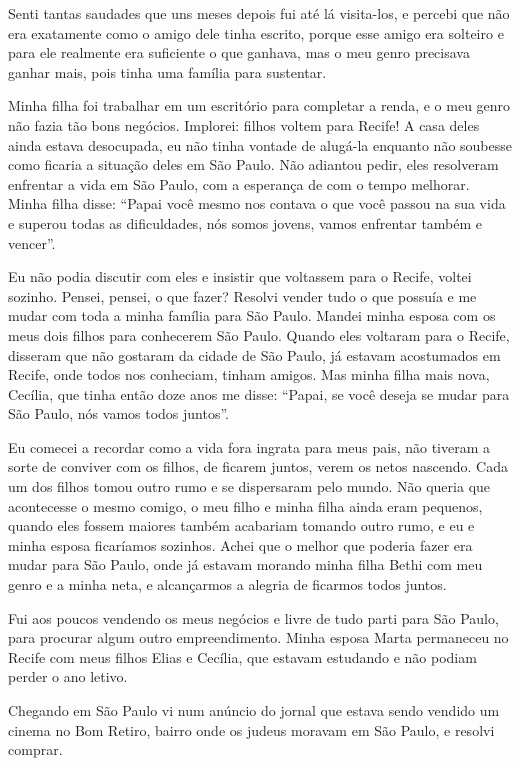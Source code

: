 Senti tantas saudades que uns meses depois fui até lá visita-los, e
percebi que não era exatamente como o amigo dele tinha escrito, porque
esse amigo era solteiro e para ele realmente era suficiente o que
ganhava, mas o meu genro precisava ganhar mais, pois tinha uma família
para sustentar.

Minha filha foi trabalhar em um escritório para completar a renda, e o
meu genro não fazia tão bons negócios. Implorei: filhos voltem para
Recife! A casa deles ainda estava desocupada, eu não tinha vontade de
alugá-la enquanto não soubesse como ficaria a situação deles em São
Paulo. Não adiantou pedir, eles resolveram enfrentar a vida em São
Paulo, com a esperança de com o tempo melhorar. Minha filha disse:
``Papai você mesmo nos contava o que você passou na sua vida e superou
todas as dificuldades, nós somos jovens, vamos enfrentar também e
vencer''.

Eu não podia discutir com eles e insistir que voltassem para o Recife,
voltei sozinho. Pensei, pensei, o que fazer? Resolvi vender tudo o que
possuía e me mudar com toda a minha família para São Paulo. Mandei minha
esposa com os meus dois filhos para conhecerem São Paulo. Quando eles
voltaram para o Recife, disseram que não gostaram da cidade de São
Paulo, já estavam acostumados em Recife, onde todos nos conheciam,
tinham amigos. Mas minha filha mais nova, Cecília, que tinha então doze
anos me disse: ``Papai, se você deseja se mudar para São Paulo, nós
vamos todos juntos''.

Eu comecei a recordar como a vida fora ingrata para meus pais, não
tiveram a sorte de conviver com os filhos, de ficarem juntos, verem os
netos nascendo. Cada um dos filhos tomou outro rumo e se dispersaram
pelo mundo. Não queria que acontecesse o mesmo comigo, o meu filho e
minha filha ainda eram pequenos, quando eles fossem maiores também
acabariam tomando outro rumo, e eu e minha esposa ficaríamos sozinhos.
Achei que o melhor que poderia fazer era mudar para São Paulo, onde já
estavam morando minha filha Bethi com meu genro e a minha neta, e
alcançarmos a alegria de ficarmos todos juntos.

Fui aos poucos vendendo os meus negócios e livre de tudo parti para São
Paulo, para procurar algum outro empreendimento. Minha esposa Marta
permaneceu no Recife com meus filhos Elias e Cecília, que estavam
estudando e não podiam perder o ano letivo.

Chegando em São Paulo vi num anúncio do jornal que estava sendo vendido
um cinema no Bom Retiro, bairro onde os judeus moravam em São Paulo, e
resolvi comprar.

